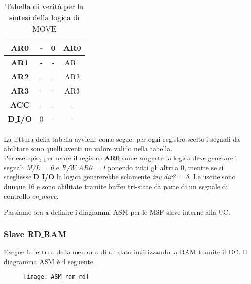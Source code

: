 \begin{table}[H]
\begin{tabular}{|p{25mm}|p{5mm}|p{5mm}|p{25mm}|}
		\hline
		\multicolumn{1}{|c|}{\textbf{AR0}} &
		\multicolumn{1}{c|}{-} &
		\multicolumn{1}{|c|}{0} &
		\multicolumn{1}{c|}{AR0}\\
		
		\hline
		\multicolumn{1}{|c|}{\textbf{AR1}} &
		\multicolumn{1}{c|}{-} &
		\multicolumn{1}{|c|}{-} &
		\multicolumn{1}{c|}{AR1}\\
		
		\hline
		\multicolumn{1}{|c|}{\textbf{AR2}} &
		\multicolumn{1}{c|}{-} &
		\multicolumn{1}{|c|}{-} &
		\multicolumn{1}{c|}{AR2}\\
		
		\hline
		\multicolumn{1}{|c|}{\textbf{AR3}} &
		\multicolumn{1}{c|}{-} &
		\multicolumn{1}{|c|}{-} &
		\multicolumn{1}{c|}{AR3}\\
		
		\hline
		\multicolumn{1}{|c|}{\textbf{ACC}} &
		\multicolumn{1}{c|}{-} &
		\multicolumn{1}{|c|}{-} &
		\multicolumn{1}{c|}{-}\\
		
		\hline
		\multicolumn{1}{|c|}{\textbf{D$\_$I/O}} &
		\multicolumn{1}{c|}{0} &
		\multicolumn{1}{|c|}{-} &
		\multicolumn{1}{c|}{-}\\
		\hline
	\end{tabular}
	\caption{Tabella di verità per la sintesi della logica di MOVE}
\end{table}
\noindent
La lettura della tabella avviene come segue: per ogni registro scelto i segnali da abilitare sono quelli aventi un valore valido nella tabella.\\
Per esempio, per usare il registro \textbf{AR0} come sorgente la logica deve generare i segnali \textit{M/$\overline{L}$ = 0} e \textit{R/$\overline{W}\_$AR0 = 1} ponendo tutti gli altri a 0, mentre se si scegliesse \textbf{D$\_$I/O} la logica genererebbe solamente \textit{inv$\_$dir? = 0}. Le uscite sono dunque 16 e sono abilitate tramite buffer tri-state da parte di un segnale di controllo \textit{en$\_$move}.
\par \bigskip \noindent
Passiamo ora a definire i diagrammi ASM per le MSF slave interne alla UC.
\newpage
\subsubsection{Slave RD$\_$RAM}
Esegue la lettura della memoria di un dato indirizzando la RAM tramite il DC. Il diagramma ASM è il seguente.
\begin{figure}[H]
	\centering
	\texttt{[image: ASM\_ram\_rd]}
	\label{fig:asm_ram_rd}
\end{figure}

